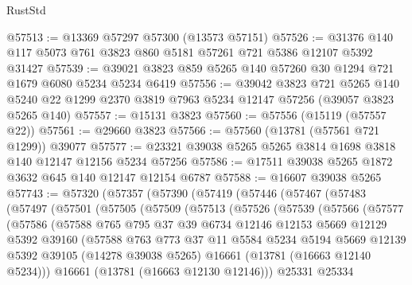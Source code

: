 \begin{lexlean}{RustStd}
\begin{coremodule}
@57513 := @13369 @57297 @57300 (@13573 @57151)
@57526 := @31376 @140 @117 @5073 @761 @3823 @860 @5181 @57261 @721 @5386 @12107 @5392 @31427
@57539 := @39021 @3823 @859 @5265 @140 @57260 @30 @1294 @721 @1679 @6080 @5234 @5234 @6419
@57556 := @39042
    @3823
    @721
    @5265
    @140
    @5240
    @22
    @1299
    @2370
    @3819
    @7963
    @5234
    @12147
    @57256
    (@39057 @3823 @5265 @140)
@57557 := @15131 @3823
@57560 := @57556 (@15119 (@57557 @22))
@57561 := @29660 @3823
@57566 := @57560 (@13781 (@57561 @721 @1299)) @39077
@57577 := @23321 @39038 @5265 @5265 @3814 @1698 @3818 @140 @12147 @12156 @5234 @57256
@57586 := @17511 @39038 @5265 @1872 @3632 @645 @140 @12147 @12154 @6787
@57588 := @16607 @39038 @5265
@57743 := @57320
    (@57357
      (@57390
        (@57419
          (@57446
            (@57467
              (@57483
                (@57497
                  (@57501
                    (@57505
                      (@57509
                        (@57513
                          (@57526
                            (@57539
                              (@57566
                                (@57577
                                  (@57586
                                    (@57588
                                      @765
                                      @795
                                      @37
                                      @39
                                      @6734
                                      @12146
                                      @12153
                                      @5669
                                      @12129
                                      @5392
                                      @39160
                                      (@57588
                                        @763
                                        @773
                                        @37
                                        @11
                                        @5584
                                        @5234
                                        @5194
                                        @5669
                                        @12139
                                        @5392
                                        @39105
                                        (@14278 @39038 @5265)
                                        @16661
                                        (@13781 (@16663 @12140 @5234)))
                                      @16661
                                      (@13781 (@16663 @12130 @12146)))
                                    @25331
                                    @25334

\end{coremodule}
\end{lexlean}
